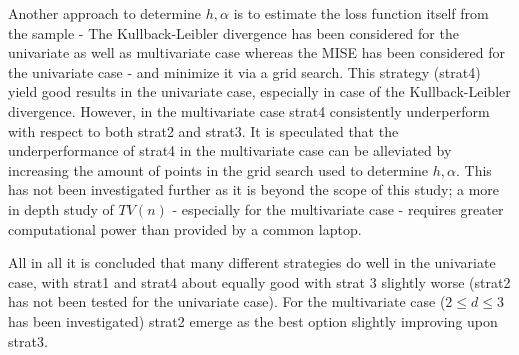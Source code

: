 Another approach to determine $h,\alpha$ is to estimate the loss function itself from the sample - The Kullback-Leibler divergence has been considered for the univariate as well as multivariate case whereas the MISE has been considered for the univariate case - and minimize it via a grid search. This strategy (strat4) yield good results in the univariate case, especially in case of the Kullback-Leibler divergence. However, in the multivariate case strat4 consistently underperform  with respect to both strat2 and strat3. It is speculated that the underperformance of strat4 in the multivariate case can be alleviated by increasing the amount of points in the grid search used to determine $h,\alpha$. This has not been investigated further as it is beyond the scope of this study; a more in depth study of $TV(n)$ - especially for the multivariate case - requires greater computational power than provided by a common laptop.\newline\newline

\noindent All in all it is concluded that many different strategies do well in the univariate case, with strat1 and strat4 about equally good with strat 3 slightly worse (strat2 has not been tested for the univariate case). For the multivariate case ($2\leq d\leq 3$ has been investigated) strat2 emerge as the best option slightly improving upon strat3. 